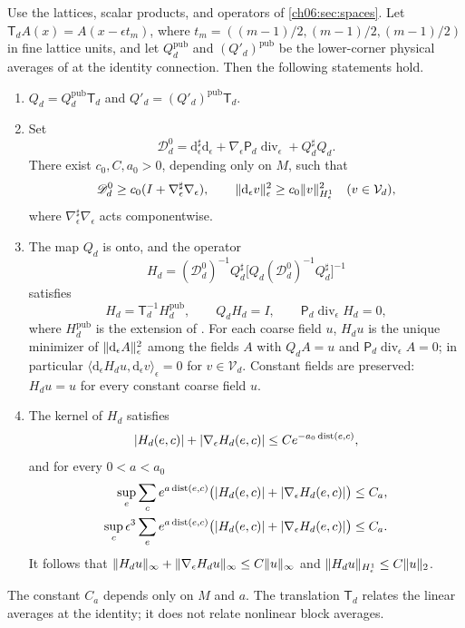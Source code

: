 \begin{theorem}\label{ch06:thm:matched-flat-extension}
Use the lattices, scalar products, and operators of \cref{ch06:sec:spaces}. Let $\mathsf T_dA(x)=A(x-\epsilon t_m)$, where $t_m=((m-1)/2,(m-1)/2,(m-1)/2)$ in fine lattice units, and let $Q_d^{\mathrm{pub}}$ and $(Q'_d)^{\mathrm{pub}}$ be the lower-corner physical averages of \cite[(1.11), p.~19; (1.18), p.~20]{Balaban1984I} at the identity connection. Then the following statements hold.
\begin{enumerate}
\item $Q_d=Q_d^{\mathrm{pub}}\mathsf T_d$ and $Q'_d=(Q'_d)^{\mathrm{pub}}\mathsf T_d$.
\item Set
\[
 \mathscr D_d^0=\mathrm d_\epsilon^\sharp\mathrm d_\epsilon+\nabla_\epsilon\mathsf P_d\operatorname{div}_\epsilon+Q_d^\sharp Q_d.
\]
There exist $c_0,C,a_0>0$, depending only on $M$, such that
\[
 \mathscr D_d^0\ge c_0(I+\nabla_\epsilon^\sharp\nabla_\epsilon),\qquad\lVert \mathrm d_\epsilon v\rVert_\epsilon^2\ge c_0\lVert v\rVert_{H^1_\epsilon}^2\quad(v\in\mathcal V_d),
\]
where $\nabla_\epsilon^\sharp\nabla_\epsilon$ acts componentwise.
\item The map $Q_d$ is onto, and the operator
\[
 H_d=(\mathscr D_d^0)^{-1}Q_d^\sharp\bigl[Q_d(\mathscr D_d^0)^{-1}Q_d^\sharp\bigr]^{-1}
\]
satisfies
\[
 H_d=\mathsf T_d^{-1}H_d^{\mathrm{pub}},\qquad Q_dH_d=I,\qquad\mathsf P_d\operatorname{div}_\epsilon H_d=0,
\]
where $H_d^{\mathrm{pub}}$ is the extension of \cite[(1.60)--(1.64), pp.~28--29; (1.103), p.~34]{Balaban1984I}. For each coarse field $u$, $H_du$ is the unique minimizer of $\lVert \mathrm d_\epsilon A\rVert_\epsilon^2$ among the fields $A$ with $Q_dA=u$ and $\mathsf P_d\operatorname{div}_\epsilon A=0$; in particular $\langle\mathrm d_\epsilon H_du,\mathrm d_\epsilon v\rangle_\epsilon=0$ for $v\in\mathcal V_d$. Constant fields are preserved: $H_du=u$ for every constant coarse field $u$.
\item The kernel of $H_d$ satisfies
\[
 \lvert H_d(e,c)\rvert+\lvert \nabla_\epsilon H_d(e,c)\rvert\le Ce^{-a_0\operatorname{dist}(e,c)},
\]
and for every $0<a<a_0$
\[
 \begin{aligned}
 \sup_e\sum_ce^{a\operatorname{dist}(e,c)}\bigl(\lvert H_d(e,c)\rvert+\lvert \nabla_\epsilon H_d(e,c)\rvert\bigr)&\le C_a,\\
 \sup_c\epsilon^3\sum_ee^{a\operatorname{dist}(e,c)}\bigl(\lvert H_d(e,c)\rvert+\lvert \nabla_\epsilon H_d(e,c)\rvert\bigr)&\le C_a.
 \end{aligned}
\]
It follows that $\lVert H_du\rVert_\infty+\lVert \nabla_\epsilon H_du\rVert_\infty\le C\lVert u\rVert_\infty$ and $\lVert H_du\rVert_{H^1_\epsilon}\le C\lVert u\rVert_2$.
\end{enumerate}
The constant $C_a$ depends only on $M$ and $a$. The translation $\mathsf T_d$ relates the linear averages at the identity; it does not relate nonlinear block averages.
\end{theorem}


